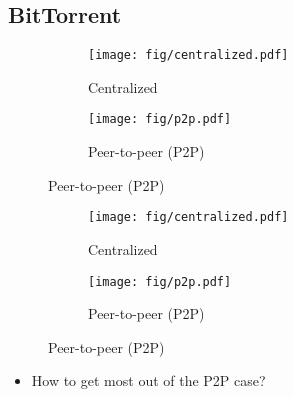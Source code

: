 \subsection{BitTorrent}

\begin{frame}
  \begin{figure}
    \begin{subfigure}{0.45\columnwidth}
      \centering
      \texttt{[image: fig/centralized.pdf]}
      \caption{Centralized}
    \end{subfigure}
    \hfill
    \begin{subfigure}{0.45\columnwidth}
      \centering
      \texttt{[image: fig/p2p.pdf]}
      \caption{Peer-to-peer (P2P)}
    \end{subfigure}
  \end{figure}
\end{frame}

\begin{frame}
  \begin{figure}
    \begin{subfigure}{0.45\columnwidth}
      \centering
      \texttt{[image: fig/centralized.pdf]}
      \caption{Centralized}
    \end{subfigure}
    \hfill
    \begin{subfigure}{0.45\columnwidth}
      \centering
      \texttt{[image: fig/p2p.pdf]}
      \caption{Peer-to-peer (P2P)}
    \end{subfigure}
  \end{figure}

  \begin{question}
    \begin{itemize}
      \item How to get most out of the P2P case?
    \end{itemize}
  \end{question}
\end{frame}

